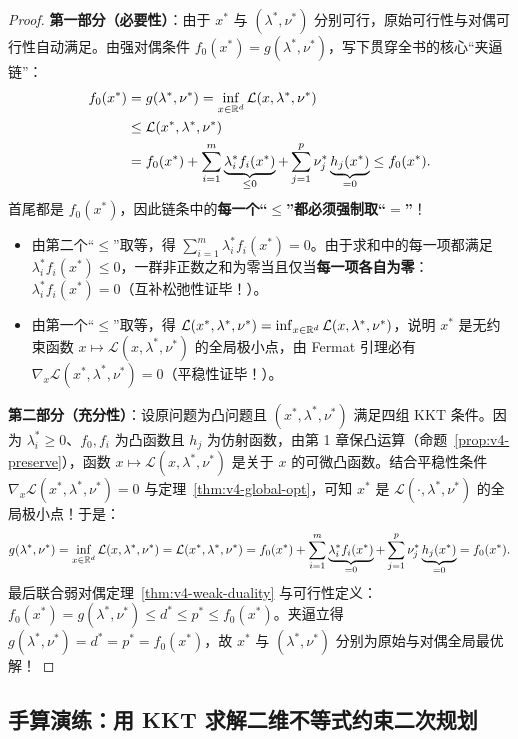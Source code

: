\begin{proof}
\textbf{第一部分（必要性）}：由于 $x^*$ 与 $(\lambda^*, \nu^*)$ 分别可行，原始可行性与对偶可行性自动满足。由强对偶条件 $f_0(x^*) = g(\lambda^*, \nu^*)$，写下贯穿全书的核心“夹逼链”：
\begin{align*}
  f_0(x^*) &= g(\lambda^*, \nu^*) = \inf_{x \in \mathbb{R}^d} \mathcal{L}(x, \lambda^*, \nu^*) \\
  &\le \mathcal{L}(x^*, \lambda^*, \nu^*) \\
  &= f_0(x^*) + \sum_{i=1}^m \underbrace{\lambda_i^* f_i(x^*)}_{\le 0} + \sum_{j=1}^p \nu_j^* \underbrace{h_j(x^*)}_{= 0}
  \le f_0(x^*).
\end{align*}
首尾都是 $f_0(x^*)$，因此链条中的\textbf{每一个“$\le$”都必须强制取“$=$”}！
\begin{itemize}
  \item 由第二个“$\le$”取等，得 $\sum_{i=1}^m \lambda_i^* f_i(x^*) = 0$。由于求和中的每一项都满足 $\lambda_i^* f_i(x^*) \le 0$，一群非正数之和为零当且仅当\textbf{每一项各自为零}：$\lambda_i^* f_i(x^*) = 0$（互补松弛性证毕！）。
  \item 由第一个“$\le$”取等，得 $\mathcal{L}(x^*, \lambda^*, \nu^*) = \inf_{x\in\mathbb{R}^d} \mathcal{L}(x, \lambda^*, \nu^*)$，说明 $x^*$ 是无约束函数 $x \mapsto \mathcal{L}(x, \lambda^*, \nu^*)$ 的全局极小点，由 Fermat 引理必有 $\nabla_x \mathcal{L}(x^*, \lambda^*, \nu^*) = 0$（平稳性证毕！）。
\end{itemize}

\textbf{第二部分（充分性）}：设原问题为凸问题且 $(x^*, \lambda^*, \nu^*)$ 满足四组 KKT 条件。因为 $\lambda_i^* \ge 0$、$f_0, f_i$ 为凸函数且 $h_j$ 为仿射函数，由第 1 章保凸运算（命题~\ref{prop:v4-preserve}），函数 $x \mapsto \mathcal{L}(x, \lambda^*, \nu^*)$ 是关于 $x$ 的可微凸函数。结合平稳性条件 $\nabla_x \mathcal{L}(x^*, \lambda^*, \nu^*) = 0$ 与定理~\ref{thm:v4-global-opt}，可知 $x^*$ 是 $\mathcal{L}(\cdot, \lambda^*, \nu^*)$ 的全局极小点！于是：
\[
  g(\lambda^*, \nu^*) = \inf_{x\in\mathbb{R}^d}\mathcal{L}(x, \lambda^*, \nu^*) = \mathcal{L}(x^*, \lambda^*, \nu^*)
  = f_0(x^*) + \sum_{i=1}^m \underbrace{\lambda_i^* f_i(x^*)}_{= 0} + \sum_{j=1}^p \nu_j^* \underbrace{h_j(x^*)}_{= 0} = f_0(x^*).
\]
最后联合弱对偶定理~\ref{thm:v4-weak-duality} 与可行性定义：$f_0(x^*) = g(\lambda^*, \nu^*) \le d^* \le p^* \le f_0(x^*)$。夹逼立得 $g(\lambda^*, \nu^*) = d^* = p^* = f_0(x^*)$，故 $x^*$ 与 $(\lambda^*, \nu^*)$ 分别为原始与对偶全局最优解！
\end{proof}

\subsection{手算演练：用 KKT 求解二维不等式约束二次规划}

